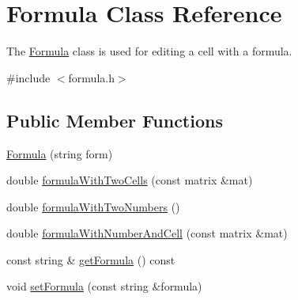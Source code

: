 \hypertarget{class_formula}{}\section{Formula Class Reference}
\label{class_formula}


The \hyperlink{class_formula}{Formula} class is used for editing a cell with a formula.  




{\ttfamily \#include $<$formula.\+h$>$}

\subsection*{Public Member Functions}
\begin{DoxyCompactItemize}
\item 
\hyperlink{class_formula_aed38ad076eb638148bcbe867d6acea60}{Formula} (string form)
\item 
double \hyperlink{class_formula_a518bc97bd50f1cc5573be7d3f8cb6253}{formula\+With\+Two\+Cells} (const matrix \&mat)
\item 
double \hyperlink{class_formula_a2159ffdb34d80f2bee422eee89fc871a}{formula\+With\+Two\+Numbers} ()
\item 
double \hyperlink{class_formula_a0f831b2ee98fbeb7df371f83ee7d374d}{formula\+With\+Number\+And\+Cell} (const matrix \&mat)
\item 
const string \& \hyperlink{class_formula_a1b9557287ed502f9523c5c7b1805bac1}{get\+Formula} () const
\item 
void \hyperlink{class_formula_aba7633655dad414ed0a1d92cdba38163}{set\+Formula} (const string \&formula)
\end{DoxyCompactItemize}
